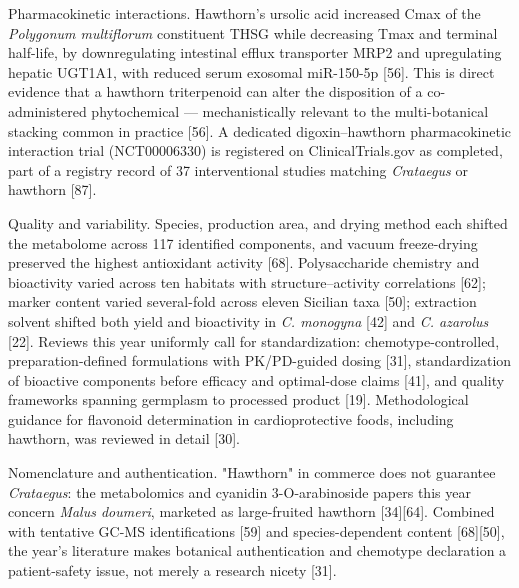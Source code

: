 \documentclass[11pt]{article}
\begin{document}
Pharmacokinetic interactions. Hawthorn's ursolic acid increased Cmax of the \emph{Polygonum multiflorum} constituent THSG while decreasing Tmax and terminal half-life, by downregulating intestinal efflux transporter MRP2 and upregulating hepatic UGT1A1, with reduced serum exosomal miR-150-5p [56]. This is direct evidence that a hawthorn triterpenoid can alter the disposition of a co-administered phytochemical --- mechanistically relevant to the multi-botanical stacking common in practice [56]. A dedicated digoxin--hawthorn pharmacokinetic interaction trial (NCT00006330) is registered on ClinicalTrials.gov as completed, part of a registry record of 37 interventional studies matching \emph{Crataegus} or hawthorn [87].

Quality and variability. Species, production area, and drying method each shifted the metabolome across 117 identified components, and vacuum freeze-drying preserved the highest antioxidant activity [68]. Polysaccharide chemistry and bioactivity varied across ten habitats with structure--activity correlations [62]; marker content varied several-fold across eleven Sicilian taxa [50]; extraction solvent shifted both yield and bioactivity in \emph{C. monogyna} [42] and \emph{C. azarolus} [22]. Reviews this year uniformly call for standardization: chemotype-controlled, preparation-defined formulations with PK/PD-guided dosing [31], standardization of bioactive components before efficacy and optimal-dose claims [41], and quality frameworks spanning germplasm to processed product [19]. Methodological guidance for flavonoid determination in cardioprotective foods, including hawthorn, was reviewed in detail [30].

Nomenclature and authentication. "Hawthorn" in commerce does not guarantee \emph{Crataegus}: the metabolomics and cyanidin 3-O-arabinoside papers this year concern \emph{Malus doumeri}, marketed as large-fruited hawthorn [34][64]. Combined with tentative GC-MS identifications [59] and species-dependent content [68][50], the year's literature makes botanical authentication and chemotype declaration a patient-safety issue, not merely a research nicety [31].
\end{document}
